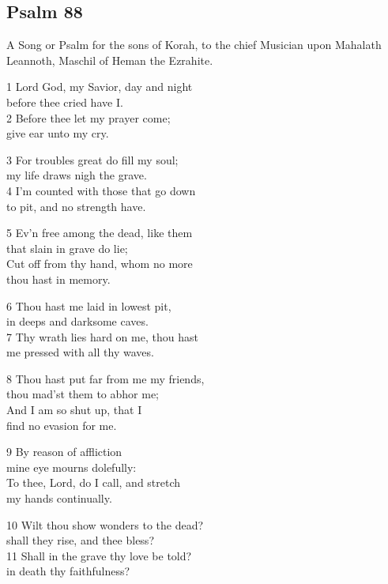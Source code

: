 \begin{center}
\quad{}\quad{}
\end{center}

\subsection*{Psalm 88}

A Song or Psalm for the sons of Korah, to the chief Musician upon Mahalath Leannoth, Maschil of Heman the Ezrahite.

1 Lord God, my Savior, day and night\\
before thee cried have I.\\
2 Before thee let my prayer come;\\
give ear unto my cry.

3 For troubles great do fill my soul;\\
my life draws nigh the grave.\\
4 I’m counted with those that go down\\
to pit, and no strength have.

5 Ev’n free among the dead, like them\\
that slain in grave do lie;\\
Cut off from thy hand, whom no more\\
thou hast in memory.

6 Thou hast me laid in lowest pit,\\
in deeps and darksome caves.\\
7 Thy wrath lies hard on me, thou hast\\
me pressed with all thy waves.

8 Thou hast put far from me my friends,\\
thou mad’st them to abhor me;\\
And I am so shut up, that I\\
find no evasion for me.

9 By reason of affliction\\
mine eye mourns dolefully:\\
To thee, Lord, do I call, and stretch\\
my hands continually.

10 Wilt thou show wonders to the dead?\\
shall they rise, and thee bless?\\
11 Shall in the grave thy love be told?\\
in death thy faithfulness?

